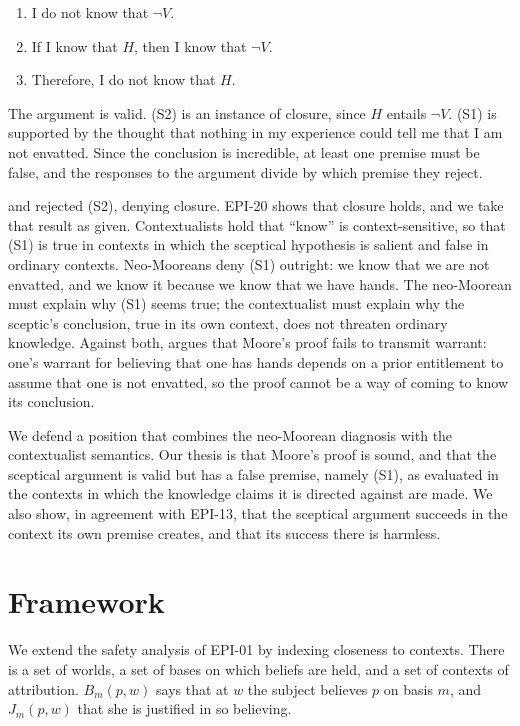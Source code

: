 \documentclass{situationist-preprint}
\begin{document}
\begin{enumerate}
\item[(S1)] I do not know that $\neg V$.
\item[(S2)] If I know that $H$, then I know that $\neg V$.
\item[(S3)] Therefore, I do not know that $H$.
\end{enumerate}

The argument is valid. (S2) is an instance of closure, since $H$ entails $\neg V$. (S1) is supported by the thought that nothing in my experience could tell me that I am not envatted. Since the conclusion is incredible, at least one premise must be false, and the responses to the argument divide by which premise they reject.

\citet{Dretske1970} and \citet{Nozick1981} rejected (S2), denying closure. EPI-20 shows that closure holds, and we take that result as given. Contextualists \citep{Cohen1988,DeRose1995,Lewis1996} hold that \enquote{know} is context-sensitive, so that (S1) is true in contexts in which the sceptical hypothesis is salient and false in ordinary contexts. Neo-Mooreans \citep{Sosa1999,Pryor2000,Williamson2000} deny (S1) outright: we know that we are not envatted, and we know it because we know that we have hands. The neo-Moorean must explain why (S1) seems true; the contextualist must explain why the sceptic's conclusion, true in its own context, does not threaten ordinary knowledge. Against both, \citet{Wright2002} argues that Moore's proof fails to transmit warrant: one's warrant for believing that one has hands depends on a prior entitlement to assume that one is not envatted, so the proof cannot be a way of coming to know its conclusion.

We defend a position that combines the neo-Moorean diagnosis with the contextualist semantics. Our thesis is that Moore's proof is sound, and that the sceptical argument is valid but has a false premise, namely (S1), as evaluated in the contexts in which the knowledge claims it is directed against are made. We also show, in agreement with EPI-13, that the sceptical argument succeeds in the context its own premise creates, and that its success there is harmless.

\section{Framework}

We extend the safety analysis of EPI-01 by indexing closeness to contexts. There is a set of worlds, a set of bases on which beliefs are held, and a set of contexts of attribution. $B_m(p,w)$ says that at $w$ the subject believes $p$ on basis $m$, and $J_m(p,w)$ that she is justified in so believing.
\end{document}
